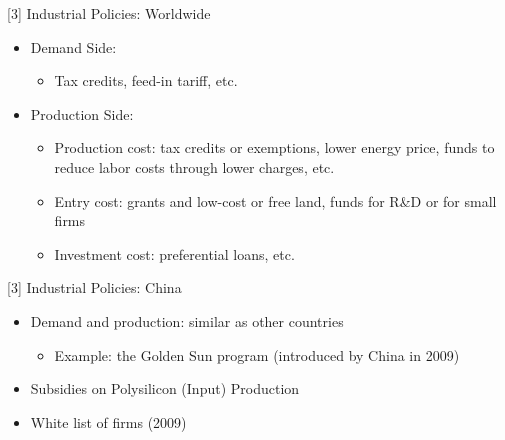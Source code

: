 \documentclass[xcolor=dvipsnames,envcountsect]{beamer}
\begin{document}

\begin{frame}{[3] Industrial Policies: Worldwide}
\begin{itemize}
    \item Demand Side:
    \begin{itemize}
        \item Tax credits, feed-in tariff, etc.
     \end{itemize}
    \item Production Side:
    \begin{itemize}
        \item Production cost: tax credits or exemptions, lower energy price, funds to reduce labor costs through lower charges, etc.
        \item Entry cost: grants and low-cost or free land, funds for R\&D or for small firms
        \item Investment cost: preferential loans, etc.
     \end{itemize}
\end{itemize}
\end{frame}

\begin{frame}{[3] Industrial Policies: China}
    \begin{itemize}
        \item Demand and production: similar as other countries
            \begin{itemize}
            \item Example: the Golden Sun program (introduced by China in 2009)
            \end{itemize}
        \item Subsidies on Polysilicon (Input) Production
        \item White list of firms (2009)
    \end{itemize}
\end{frame}
\end{document}
